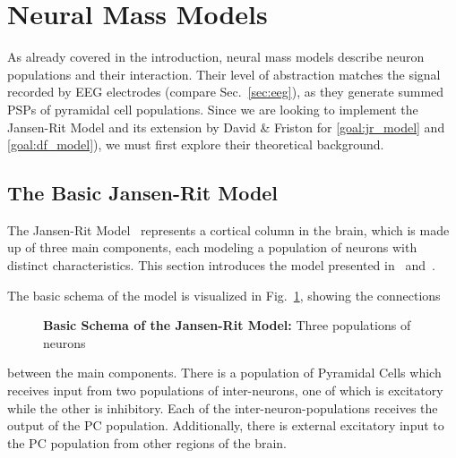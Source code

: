 \newcommand*\circled[2][black]{\tikz[baseline=(char.base)]{
    \node[scale=0.85pt,shape=circle, thin,draw=#1!60, fill=#1!5,inner sep=0.1pt] (char) {#2};}}



\section{Neural Mass Models}\label{sec:neural-mass-models}

As already covered in the introduction,
neural mass models describe neuron populations and their interaction.
Their level of abstraction matches the signal recorded by EEG electrodes (compare Sec.~\ref{sec:eeg}),
as they generate summed PSPs of pyramidal cell populations.
Since we are looking to implement the Jansen-Rit Model and its extension by David \& Friston
for \ref{goal:jr_model} and \ref{goal:df_model}),
we must first explore their theoretical background.

\subsection{The Basic Jansen-Rit Model}\label{subsec:the-jansen-rit-model}

The Jansen-Rit Model~\cite{jansen_neurophysiologically-based_1993, jansen_electroencephalogram_1995}
represents a cortical column in the brain, which is made up of three main components,
each modeling a population of neurons with distinct characteristics.
This section introduces the model presented in~\cite{jansen_neurophysiologically-based_1993}
and~\cite{jansen_electroencephalogram_1995}.

The basic schema of the model is visualized in Fig.~\ref{fig:Jansen Rit Flowchart}, showing the connections
\begin{figure}
    
    \caption{\textbf{Basic Schema of the Jansen-Rit Model:} Three populations of neurons}
    \label{fig:Jansen Rit Flowchart}
\end{figure}
between the main components.
There is a population of Pyramidal Cells which receives input from two populations of inter-neurons,
one of which is excitatory while the other is inhibitory.
Each of the inter-neuron-populations receives the output of the PC population.
Additionally, there is external excitatory input to the PC population from other regions of the brain.

